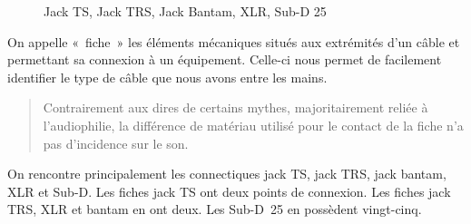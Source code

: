 \documentclass[
  letterpaper,
  DIV=11,
  numbers=noendperiod]{scrreprt}
\begin{document}
\begin{figure}
\begin{minipage}[t]{0.20\linewidth}
{{}

}

\end{minipage}%
%
\begin{minipage}[t]{0.20\linewidth}

{\centering 


}

\end{minipage}%

\caption{\label{fig-fiches}Jack TS, Jack TRS, Jack Bantam, XLR, Sub-D
25}

\end{figure}

On appelle «~fiche~» les éléments mécaniques situés aux extrémités d'un
câble et permettant sa connexion à un équipement. Celle-ci nous permet
de facilement identifier le type de câble que nous avons entre les
mains.

\begin{quote}
Contrairement aux dires de certains mythes, majoritairement reliée à
l'audiophilie, la différence de matériau utilisé pour le contact de la
fiche n'a pas d'incidence sur le son.
\end{quote}

On rencontre principalement les connectiques jack TS, jack TRS, jack
bantam, XLR et Sub-D. Les fiches jack TS ont deux points de connexion.
Les fiches jack TRS, XLR et bantam en ont deux. Les Sub-D~25 en
possèdent vingt-cinq.
\end{document}
